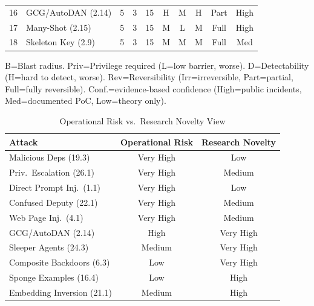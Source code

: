\documentclass[conference]{IEEEtran}
\newcommand{\tableheaderrow}{\rowcolor{accentblue}}
\renewcommand{\thead}[1]{\textbf{\color{white}\sffamily #1}}
\begin{document}
\begin{table}[!htbp]
\begin{tabular}{cp{2.0cm}cccccccc}
\midrule
\rowcolor{rowalt} 16 & GCG/AutoDAN (2.14) & 5 & 3 & 15 & H & M & H & Part & High \\
17 & Many-Shot (2.15) & 5 & 3 & 15 & M & L & M & Full & High \\
\rowcolor{rowalt} 18 & Skeleton Key (2.9) & 5 & 3 & 15 & M & M & M & Full & Med \\
\bottomrule
\end{tabular}
\par\vspace{3pt}
{\scriptsize\sffamily\color{gray} B=Blast radius. Priv=Privilege required (L=low barrier, worse). D=Detectability (H=hard to detect, worse). Rev=Reversibility (Irr=irreversible, Part=partial, Full=fully reversible). Conf.=evidence-based confidence (High=public incidents, Med=documented PoC, Low=theory only).}
\end{table}

\begin{table}[!htbp]
\centering
\caption{Operational Risk vs.\ Research Novelty View}
\label{tab:tiebreak}
\renewcommand{\arraystretch}{1.15}
\scriptsize\sffamily
\begin{tabular}{p{2.8cm}cc}
\toprule
\tableheaderrow \thead{Attack} & \thead{Operational Risk} & \thead{Research Novelty} \\
\toprule
\rowcolor{rowalt} Malicious Deps (19.3) & Very High & Low \\
Priv.\ Escalation (26.1) & Very High & Medium \\
\rowcolor{rowalt} Direct Prompt Inj.\ (1.1) & Very High & Low \\
Confused Deputy (22.1) & Very High & Medium \\
\rowcolor{rowalt} Web Page Inj.\ (4.1) & Very High & Medium \\
GCG/AutoDAN (2.14) & High & Very High \\
\rowcolor{rowalt} Sleeper Agents (24.3) & Medium & Very High \\
Composite Backdoors (6.3) & Low & Very High \\
\rowcolor{rowalt} Sponge Examples (16.4) & Low & High \\
Embedding Inversion (21.1) & Medium & High \\
\bottomrule
\end{tabular}
\end{table}
\end{document}
